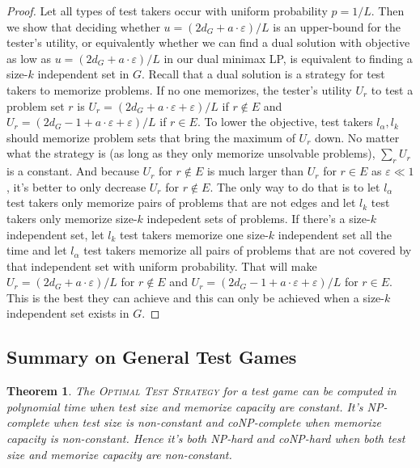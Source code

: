 \documentclass{article}
\newtheorem{theorem}{Theorem}
\begin{document}
\begin{proof}
Let all types of test takers occur with uniform probability $p=1/L$.  Then we
show that deciding whether $u = (2 d_G + a\cdot \varepsilon)/L$ is an
upper-bound for the tester's utility, or equivalently whether we can find a
dual solution with objective as low as $u = (2 d_G + a\cdot \varepsilon)/L$ in
our dual minimax LP, is equivalent to finding a size-$k$ independent set in
$G$. Recall that a dual solution is a strategy for test takers to memorize
problems. If no one memorizes, the tester's utility $U_r$ to test a problem set
$r$ is $U_r = (2d_G+a\cdot\varepsilon + \varepsilon) /L$ if $r \notin E$ and
$U_r = (2d_G-1+a\cdot\varepsilon + \varepsilon)/L$ if $r \in E$. To lower the
objective, test takers $l_\alpha, l_k$ should memorize problem sets that bring
the maximum of $U_r$ down.  No matter what the strategy is (as long as they
only memorize unsolvable problems), $\sum_r U_r$ is a constant. And because
$U_r$ for $r \notin E$ is much larger than $U_r$ for $r \in E$ as $\varepsilon
\ll 1$, it's better to only decrease $U_r$ for $r \notin E$. The only way to do
that is to let $l_\alpha$ test takers only memorize pairs of problems that are
not edges and let $l_k$ test takers only memorize size-$k$ indepedent sets of
problems.  If there's a size-$k$ independent set, let $l_k$ test takers
memorize one size-$k$ independent set all the time and let $l_\alpha$ test
takers memorize all pairs of problems that are not covered by that independent
set with uniform probability. That will make $U_r = (2d_G+a\cdot\varepsilon)/L$
for $r \notin E$ and $U_r = (2d_G-1+a\cdot\varepsilon+\varepsilon)/L$ for $r
\in E$.  This is the best they can achieve and this can only be achieved when a
size-$k$ independent set exists in $G$.

\end{proof}

\subsection{Summary on General Test Games}

\begin{theorem}
The \textsc{Optimal Test Strategy} for a \emph{test game} can be computed in
polynomial time when test size and memorize capacity are constant. It's
NP-complete when test size is non-constant and coNP-complete when memorize
capacity is non-constant. Hence it's both NP-hard and coNP-hard when both test
size and memorize capacity are non-constant.
\end{theorem}
\end{document}
